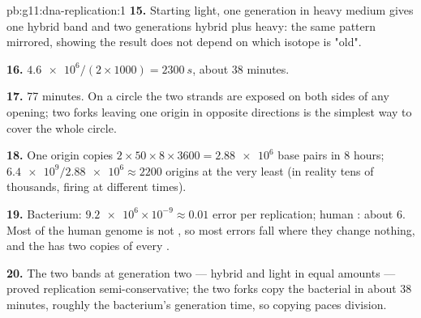 \begin{solution}{pb:g11:dna-replication:1}
\textbf{15.} Starting light, one generation in heavy medium gives one
hybrid band and two generations hybrid plus heavy: the same pattern
mirrored, showing the result does not depend on which isotope is
"old".

\textbf{16.} $\num{4.6e6}/(2 \times 1000) = \qty{2300}{s}$, about
38 minutes.

\textbf{17.} 77 minutes. On a circle the two strands are exposed on
both sides of any opening; two forks leaving one origin in opposite
directions is the simplest way to cover the whole circle.

\textbf{18.} One origin copies $2 \times 50 \times 8 \times 3600 =
\num{2.88e6}$ base pairs in 8 hours; $\num{6.4e9}/\num{2.88e6}
\approx 2200$ origins at the very least (in reality tens of thousands,
firing at different times).

\textbf{19.} Bacterium: $\num{9.2e6} \times 10^{-9} \approx 0.01$ error
per replication; human : about 6. Most of the human genome is not
, so most errors fall where they change nothing, and the  has
two copies of every .

\textbf{20.} The two bands at generation two --- hybrid and light in
equal amounts --- proved replication semi-conservative; the two forks
copy the bacterial  in about 38 minutes, roughly the
bacterium's generation time, so copying paces division.
\end{solution}
